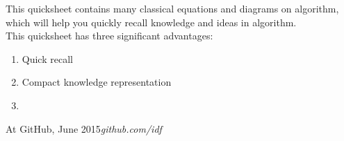 %
%

\preface

This quicksheet contains many classical equations and diagrams on algorithm, which will help you quickly recall knowledge and ideas in algorithm.\\

This quicksheet has three significant advantages:
\begin{enumerate}
\item Quick recall
\item Compact knowledge representation
\item 
\end{enumerate}

\vspace{\baselineskip}
\begin{flushright}\noindent
At GitHub, June 2015\hfill {\it github.com/idf} \\
\end{flushright}


